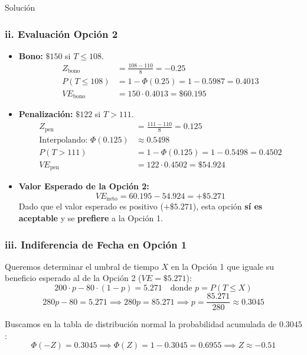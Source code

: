 \documentclass[11pt, a4paper]{article}
\begin{document}
\begin{ejercicio}{Solución}
  \subsubsection*{ii. Evaluación Opción 2}
  \begin{itemize}
    \item \textbf{Bono:} $\$150$ si $T \le 108$.
      \begin{align*}
        Z_{\text{bono}} &= \frac{108 - 110}{8} = -0.25 \\
        P(T \le 108) &= 1 - \Phi(0.25) = 1 - 0.5987 = 0.4013 \\
        VE_{\text{bono}} &= 150 \cdot 0.4013 = \$60.195
      \end{align*}
    \item \textbf{Penalización:} $\$122$ si $T > 111$.
      \begin{align*}
        Z_{\text{pen}} &= \frac{111 - 110}{8} = 0.125 \\
        \text{Interpolando: } \Phi(0.125) &\approx 0.5498 \\
        P(T > 111) &= 1 - \Phi(0.125) = 1 - 0.5498 = 0.4502 \\
        VE_{\text{pen}} &= 122 \cdot 0.4502 = \$54.924
      \end{align*}
    \item \textbf{Valor Esperado de la Opción 2:}
      \begin{equation*}
        VE_{\text{neto}} = 60.195 - 54.924 = +\$5.271
      \end{equation*}
      Dado que el valor esperado es positivo ($+\$5.271$), esta opción \textbf{sí es aceptable} y se \textbf{prefiere} a la Opción 1.
  \end{itemize}

  \subsubsection*{iii. Indiferencia de Fecha en Opción 1}
  Queremos determinar el umbral de tiempo $X$ en la Opción 1 que iguale su beneficio esperado al de la Opción 2 ($VE = \$5.271$):
  \begin{equation*}
    200 \cdot p - 80 \cdot (1 - p) = 5.271 \quad \text{donde } p = P(T \le X)
  \end{equation*}
  \begin{equation*}
    280 p - 80 = 5.271 \implies 280 p = 85.271 \implies p = \frac{85.271}{280} \approx 0.3045
  \end{equation*}

  Buscamos en la tabla de distribución normal la probabilidad acumulada de $0.3045$:
  \begin{equation*}
    \Phi(-Z) = 0.3045 \implies \Phi(Z) = 1 - 0.3045 = 0.6955 \implies Z \approx -0.51
  \end{equation*}


\end{ejercicio}
\end{document}
